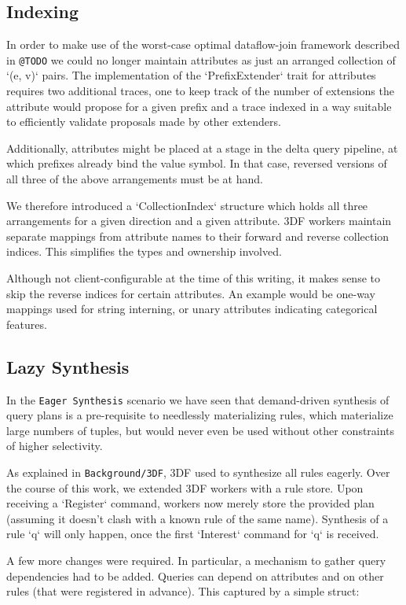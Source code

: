 \documentclass[../index.tex]{subfiles}
\begin{document}
\subsection{Indexing}

In order to make use of the worst-case optimal dataflow-join framework
described in \texttt{@TODO} we could no longer maintain attributes as just
an arranged collection of `(e, v)` pairs. The implementation of the
`PrefixExtender` trait for attributes requires two additional traces,
one to keep track of the number of extensions the attribute would
propose for a given prefix and a trace indexed in a way suitable to
efficiently validate proposals made by other extenders.

Additionally, attributes might be placed at a stage in the delta query
pipeline, at which prefixes already bind the value symbol. In that
case, reversed versions of all three of the above arrangements must be
at hand.

We therefore introduced a `CollectionIndex` structure which holds all
three arrangements for a given direction and a given attribute. 3DF
workers maintain separate mappings from attribute names to their
forward and reverse collection indices. This simplifies the types and
ownership involved.

Although not client-configurable at the time of this writing, it makes
sense to skip the reverse indices for certain attributes. An example
would be one-way mappings used for string interning, or unary
attributes indicating categorical features.

\subsection{Lazy Synthesis}

In the \texttt{Eager Synthesis} scenario we have seen that demand-driven
synthesis of query plans is a pre-requisite to needlessly
materializing rules, which materialize large numbers of tuples, but
would never even be used without other constraints of higher
selectivity.

As explained in \texttt{Background/3DF}, 3DF used to synthesize all rules
eagerly. Over the course of this work, we extended 3DF workers with a
rule store. Upon receiving a `Register` command, workers now merely
store the provided plan (assuming it doesn't clash with a known rule
of the same name). Synthesis of a rule `q` will only happen, once the
first `Interest` command for `q` is received.

A few more changes were required. In particular, a mechanism to gather
query dependencies had to be added. Queries can depend on attributes
and on other rules (that were registered in advance). This captured by
a simple struct:
\end{document}
